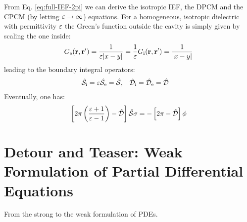 From Eq. \eqref{eq:full-IEF-2pi} we can derive the isotropic
\acs{IEF}, the \acs{DPCM} and the \acs{CPCM} (by letting
$\varepsilon\rightarrow\infty$) equations.
For a homogeneous, isotropic dielectric with permittivity $\varepsilon$ the
Green's function outside the cavity is simply given by scaling the one
inside:
\begin{equation}
  G_\mathrm{e}(\mathbf{r}, \mathbf{r}^\prime) = \frac{1}{\varepsilon|x-y|} = \frac{1}{\varepsilon} G_\mathrm{i}(\mathbf{r}, \mathbf{r}^\prime) = \frac{1}{|x-y|}
\end{equation}
leading to the boundary integral operators:
\begin{alignat}{2}
  \hat{\mathcal{S}}_\mathrm{i} = \varepsilon\hat{\mathcal{S}}_\mathrm{e} = \hat{\mathcal{S}}, \quad&
  \hat{\mathcal{D}}_\mathrm{i} = \hat{\mathcal{D}}_\mathrm{e} = \hat{\mathcal{D}}
\end{alignat}
Eventually, one has:
\begin{equation}\label{eq:isotropic-IEF}
  \left[ 2\pi \left(\frac{\varepsilon+1}{\varepsilon-1}\right)
  - \hat{\mathcal{D}} \right]\hat{\mathcal{S}}\sigma
  =
  -\left[2\pi-\hat{\mathcal{D}}\right]\phi
\end{equation}

\section{Detour and Teaser: Weak Formulation of Partial Differential Equations}\label{sec:weak}

From the strong to the weak formulation of \acp{PDE}.\autocite{Ern2004-oo}

